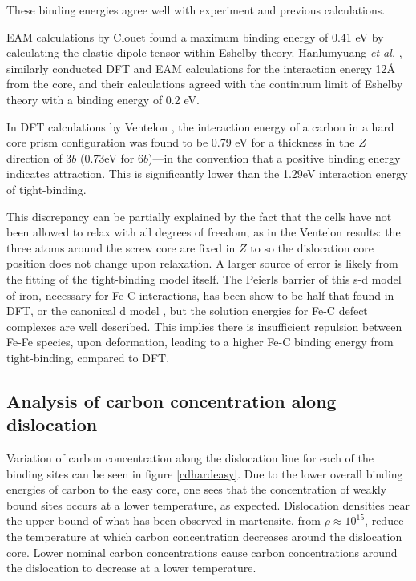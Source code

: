\documentclass[a4paper,11pt]{article}
\begin{document}
These binding energies agree well with experiment and previous calculations.

EAM calculations by Clouet \cite{Clouet2008,Becquart2007} found a maximum binding energy of 0.41 eV by
calculating the elastic dipole tensor within Eshelby theory. Hanlumyuang \emph{et al.}
\cite{Hanlumyuang2010}, similarly conducted DFT and EAM calculations for the interaction energy
12\AA{} from the core, and their calculations agreed with the continuum limit of Eshelby theory with
a binding energy of 0.2 eV.

In DFT calculations by Ventelon \cite{Ventelon2015}, the interaction energy of a carbon in a hard
core prism configuration was found to be 0.79 eV for a thickness in the \(Z\) direction of 3\(b\)
(0.73eV for \(6b\))---in the convention that a positive binding energy indicates attraction. This
is significantly lower than the 1.29eV interaction energy of tight-binding. 

This discrepancy can be partially explained by the fact that the cells have not been allowed to
relax with all degrees of freedom, as in the Ventelon results: the three atoms around the screw
core are fixed in \(Z\) to so the dislocation core position does not change upon relaxation. A
larger source of error is likely from the fitting of the tight-binding model itself. The
Peierls barrier of this s-d model of iron, necessary for Fe-C interactions, has been show to be
half that found in DFT, or the canonical d model \cite{Simpson2019}, but the solution energies for
Fe-C defect complexes are well described. This implies there is insufficient repulsion between
Fe-Fe species, upon deformation, leading to a higher Fe-C binding energy from tight-binding,
compared to DFT.




\subsection{Analysis of carbon concentration along dislocation}
\label{sec:org67f0262}

Variation of carbon concentration along the dislocation line for each of the binding sites can be
seen in figure \ref{cdhardeasy}. Due to the lower overall binding energies of carbon to the easy core, one
sees that the concentration of weakly bound sites occurs at a lower temperature, as
expected. Dislocation densities near the upper bound of what has been observed in martensite,
from \(\rho \approx10^{15}\), reduce the temperature at which carbon concentration decreases around the
dislocation core. Lower nominal carbon concentrations cause carbon concentrations
around the dislocation to decrease at a lower temperature. 
\end{document}
